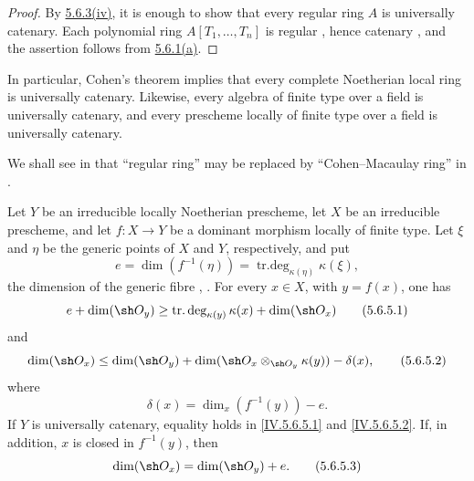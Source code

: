 \begin{proof}
By {\hyperref[IV.5.6.3.iv]{5.6.3\textup{(iv)}}}, it is enough to show
that every regular ring
$A$ is universally catenary.  Each polynomial ring
$A[T_1,\ldots,T_n]$ is regular , hence catenary
, and the assertion follows from
{\hyperref[IV.5.6.1.a]{5.6.1\textup{(a)}}}.
\end{proof}

In particular, Cohen's theorem  implies that every
complete Noetherian local ring is universally catenary.  Likewise,
every algebra of finite type over a field is universally catenary,
and every prescheme locally of finite type over a field is
universally catenary.

We shall see in  that ``regular ring'' may be replaced
by ``Cohen--Macaulay ring'' in .

\begin{proposition}[5.6.5]
\label{IV.5.6.5}
Let $Y$ be an irreducible locally Noetherian prescheme, let $X$ be
an irreducible prescheme, and let $f:X\to Y$ be a dominant morphism
locally of finite type.  Let $\xi$ and $\eta$ be the generic points
of $X$ and $Y$, respectively, and put
\[
e=\dim(f^{-1}(\eta))
  =\operatorname{tr.deg}_{\kappa(\eta)}\kappa(\xi),
\]
the dimension of the generic fibre
, .
For every $x\in X$, with $y=f(x)$, one has
\begin{equation}
e+\dim(\sh O_y)
 \geq \operatorname{tr.deg}_{\kappa(y)}\kappa(x)
       +\dim(\sh O_x)
\tag{5.6.5.1}\label{IV.5.6.5.1}
\end{equation}
and
\begin{equation}
\dim(\sh O_x)
 \leq \dim(\sh O_y)
      +\dim(\sh O_x\otimes_{\sh O_y}\kappa(y))
      -\delta(x),
\tag{5.6.5.2}\label{IV.5.6.5.2}
\end{equation}
where
\[
\delta(x)=\dim_x(f^{-1}(y))-e.
\]
If $Y$ is universally catenary, equality holds in
\eqref{IV.5.6.5.1} and \eqref{IV.5.6.5.2}.  If, in addition, $x$ is
closed in $f^{-1}(y)$, then
\begin{equation}
\dim(\sh O_x)=\dim(\sh O_y)+e.
\tag{5.6.5.3}\label{IV.5.6.5.3}
\end{equation}
\end{proposition}

